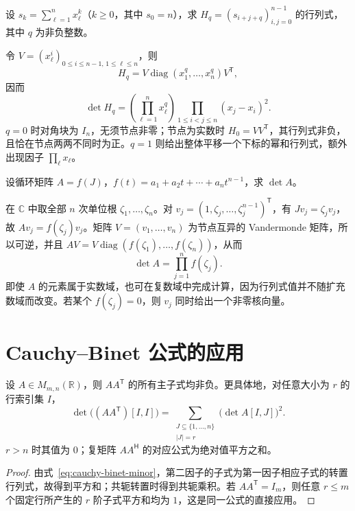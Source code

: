 \begin{example}
\label{ex:matrix-hankel-moments}
设 $s_k=\sum_{\ell=1}^n x_\ell^k$（$k\ge0$，其中 $s_0=n$），求 $H_q=(s_{i+j+q})_{i,j=0}^{n-1}$ 的行列式，其中 $q$ 为非负整数。
\end{example}
\begin{solve}
令 $V=(x_\ell^i)_{0\le i\le n-1,\,1\le\ell\le n}$，则
\[
 H_q=V\operatorname{diag}(x_1^q,\ldots,x_n^q)V^{\mathsf T},
\]
因而
\begin{equation}
 \det H_q=\left(\prod_{\ell=1}^n x_\ell^q\right)
 \prod_{1\le i<j\le n}(x_j-x_i)^2.
 \label{eq:matrix-hankel-determinant}
\end{equation}
$q=0$ 时对角块为 $I_n$，无须节点非零；节点为实数时 $H_0=VV^{\mathsf T}$，其行列式非负，且恰在节点两两不同时为正。$q=1$ 则给出整体平移一个下标的幂和行列式，额外出现因子 $\prod_\ell x_\ell$。
\end{solve}

\begin{example}
\label{ex:matrix-circulant-determinant}
设循环矩阵 $A=f(J)$，$f(t)=a_1+a_2t+\cdots+a_nt^{n-1}$，求 $\det A$。
\end{example}
\begin{solve}
在 $\mathbb C$ 中取全部 $n$ 次单位根 $\zeta_1,\ldots,\zeta_n$。对 $v_j=(1,\zeta_j,\ldots,\zeta_j^{n-1})^{\mathsf T}$，有 $Jv_j=\zeta_jv_j$，故 $Av_j=f(\zeta_j)v_j$。矩阵 $V=(v_1,\ldots,v_n)$ 为节点互异的 Vandermonde 矩阵，所以可逆，并且 $AV=V\operatorname{diag}(f(\zeta_1),\ldots,f(\zeta_n))$，从而
\begin{equation}
 \det A=\prod_{j=1}^n f(\zeta_j).
 \label{eq:matrix-circulant-determinant}
\end{equation}
即使 $A$ 的元素属于实数域，也可在复数域中完成计算，因为行列式值并不随扩充数域而改变。若某个 $f(\zeta_j)=0$，则 $v_j$ 同时给出一个非零核向量。
\end{solve}

\section{Cauchy--Binet 公式的应用}
\label{sec:matrix-cauchy-binet-applications}

\begin{proposition}
\label{prop:matrix-gram-minors}
设 $A\in M_{m,n}(\mathbb R)$，则 $AA^{\mathsf T}$ 的所有主子式均非负。更具体地，对任意大小为 $r$ 的行索引集 $I$，
\begin{equation}
 \det\bigl((AA^{\mathsf T})[I,I]\bigr)
 =\sum_{\substack{J\subseteq\{1,\ldots,n\}\\|J|=r}}\bigl(\det A[I,J]\bigr)^2.
 \label{eq:matrix-gram-minors}
\end{equation}
$r>n$ 时其值为 $0$；复矩阵 $AA^{\mathsf H}$ 的对应公式为绝对值平方之和。
\end{proposition}
\begin{proof}
由式~\eqref{eq:cauchy-binet-minor}，第二因子的子式为第一因子相应子式的转置行列式，故得到平方和；共轭转置时得到共轭乘积。若 $AA^{\mathsf T}=I_m$，则任意 $r\le m$ 个固定行所产生的 $r$ 阶子式平方和均为 $1$，这是同一公式的直接应用。
\end{proof}

